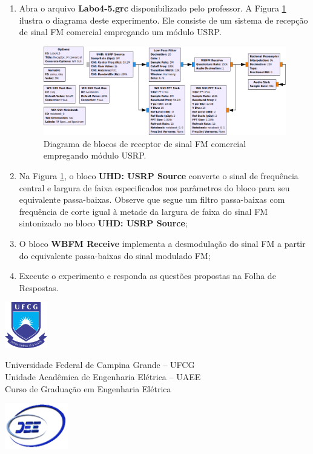 \documentclass[12pt,addpoints]{exam}
\begin{document}
\begin{enumerate}
    \item  Abra o arquivo \textbf{Labo4-5.grc} disponibilizado pelo professor. A Figura \ref{fig:GRC_4-5} ilustra o diagrama deste experimento. Ele consiste de um sistema de recepção de sinal FM comercial empregando um módulo USRP. 
    \begin{figure}[htb]
        \centering
        \includegraphics[scale=.5]{./Figuras/Labo4-5}
        \caption{Diagrama de blocos de receptor de sinal FM comercial empregando módulo USRP.} 
        \label{fig:GRC_4-5}
    \end{figure}
    \item Na Figura \ref{fig:GRC_4-5}, o bloco \textbf{UHD: USRP Source} converte o sinal de frequência central e largura de faixa especificados nos parâmetros do bloco para seu equivalente passa-baixas. Observe que segue um filtro passa-baixas com frequência de corte igual à metade da largura de faixa do sinal FM sintonizado no bloco \textbf{UHD: USRP Source};
    \item O bloco \textbf{WBFM Receive} implementa a desmodulação do sinal FM a partir do equivalente passa-baixas do sinal modulado FM;
    \item Execute o experimento e responda as questões propostas na Folha de Respostas.
\end{enumerate}

\newpage {}

\noindent \includegraphics[height=2cm]{../Figuras/UFCGLogo} \hfill
\begin{minipage}{.66\textwidth} \large \centering \vspace{-1.8cm}
    Universidade Federal de Campina Grande -- UFCG \\
    Unidade Acadêmica de Engenharia Elétrica -- UAEE \\
    Curso de Graduação em Engenharia Elétrica
\end{minipage}
\hfill \includegraphics[height=2cm]{../Figuras/DEELogo} \\[12pt]
\end{document}
